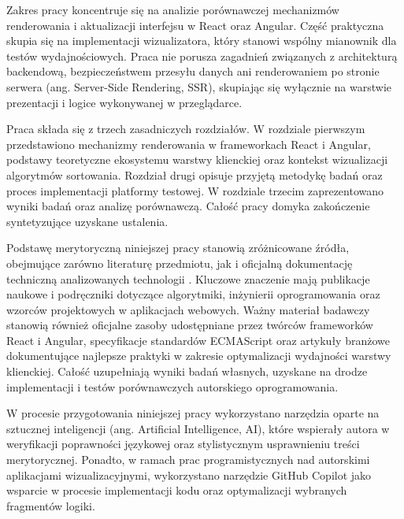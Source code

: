 \documentclass[12pt,openright,twoside]{report}
\begin{document}
Zakres pracy koncentruje się na analizie porównawczej mechanizmów renderowania i aktualizacji interfejsu w React oraz Angular. Część praktyczna skupia się na implementacji wizualizatora, który stanowi wspólny mianownik dla testów wydajnościowych. Praca nie porusza zagadnień związanych z architekturą backendową, bezpieczeństwem przesyłu danych ani renderowaniem po stronie serwera (ang. Server-Side Rendering, SSR), skupiając się wyłącznie na warstwie prezentacji i logice wykonywanej w przeglądarce.

Praca składa się z trzech zasadniczych rozdziałów. W rozdziale pierwszym przedstawiono mechanizmy renderowania w frameworkach React i Angular, podstawy teoretyczne ekosystemu warstwy klienckiej oraz kontekst wizualizacji algorytmów sortowania. Rozdział drugi opisuje przyjętą metodykę badań oraz proces implementacji platformy testowej. W rozdziale trzecim zaprezentowano wyniki badań oraz analizę porównawczą. Całość pracy domyka zakończenie syntetyzujące uzyskane ustalenia.

Podstawę merytoryczną niniejszej pracy stanowią zróżnicowane źródła, obejmujące zarówno literaturę przedmiotu, jak i oficjalną dokumentację techniczną analizowanych technologii \cite{React_Official, Angular_Docs, Cormen_Intro, Design_Patterns_JS}. Kluczowe znaczenie mają publikacje naukowe i podręczniki dotyczące algorytmiki, inżynierii oprogramowania oraz wzorców projektowych w aplikacjach webowych. Ważny materiał badawczy stanowią również oficjalne zasoby udostępniane przez twórców frameworków React i Angular, specyfikacje standardów ECMAScript oraz artykuły branżowe dokumentujące najlepsze praktyki w zakresie optymalizacji wydajności warstwy klienckiej. Całość uzupełniają wyniki badań własnych, uzyskane na drodze implementacji i testów porównawczych autorskiego oprogramowania.

W procesie przygotowania niniejszej pracy wykorzystano narzędzia oparte na sztucznej inteligencji (ang. Artificial Intelligence, AI), które wspierały autora w weryfikacji poprawności językowej oraz stylistycznym usprawnieniu treści merytorycznej. Ponadto, w ramach prac programistycznych nad autorskimi aplikacjami wizualizacyjnymi, wykorzystano narzędzie GitHub Copilot jako wsparcie w procesie implementacji kodu oraz optymalizacji wybranych fragmentów logiki.
\end{document}
